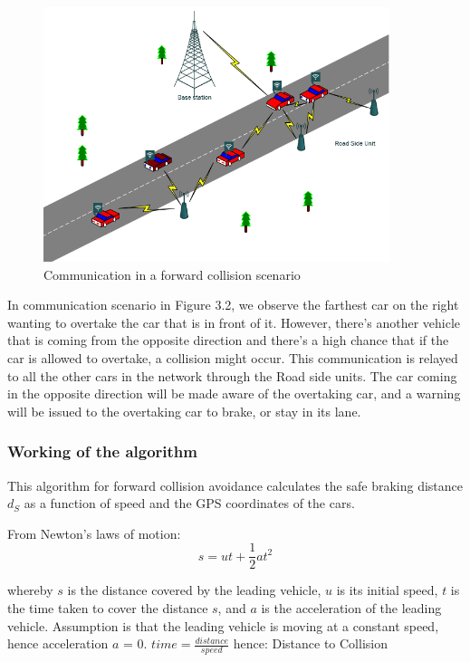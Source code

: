 \documentclass[12pt]{report}
\begin{document}
\begin{figure}[!h]
	\includegraphics[width=0.9\textwidth]{fcw.png}
	\caption{Communication in a forward collision scenario}
	\label{fig}
\end{figure}
In communication scenario in Figure 3.2, we observe the farthest car on the right wanting to overtake the car that is in front of it. However, there’s another vehicle that is coming from the opposite direction and there’s a high chance that if the car is allowed to overtake, a collision might occur. This communication is relayed to all the other cars in the network through the Road side units. The car coming in the opposite direction will be made aware of the overtaking car, and a warning will be issued to the overtaking car to brake, or stay in its lane.

\subsubsection{Working of the algorithm}
 This algorithm for forward collision avoidance calculates the safe braking distance  $d_S$  as a function of speed and the GPS coordinates of the cars.
 
 From Newton's laws of motion:
 \begin{equation}
 	s = ut + \frac{1}{2} a t^2
\end{equation}

whereby $s$ is the distance covered by the leading vehicle, $u$ is its initial speed, $t$ is the time taken to cover the distance $s$, and $a$ is the acceleration of the leading vehicle. 
Assumption is that the leading vehicle is moving at a constant speed, hence acceleration $a$ = 0.
$time = \frac{distance}{speed}$ hence: 
Distance to Collision 
\end{document}
